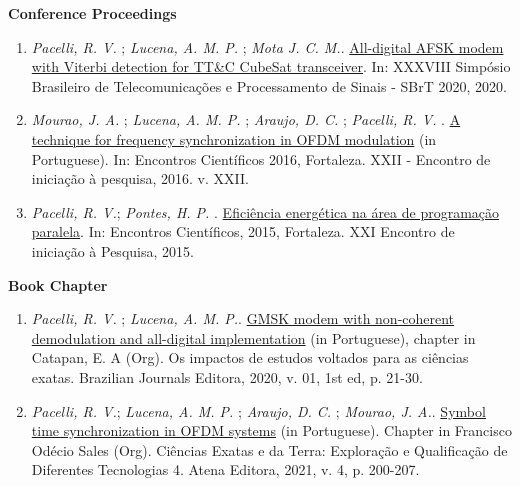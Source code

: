 \textbf{Conference Proceedings}
\begin{enumerate}[label=\textbf{C\arabic*.}, align=left, leftmargin=1.5cm]
    \item \textit{Pacelli, R. V.} ; \textit{Lucena, A. M. P.} ; \textit{Mota J. C. M.}. \href{http://www.sbrt.org.br/sbrt2020/papers/1570654898.pdf}{All-digital AFSK modem with Viterbi detection for TT\&C CubeSat transceiver}. In: XXXVIII Simpósio Brasileiro de Telecomunicações e Processamento de Sinais - SBrT 2020, 2020.
    \item \textit{Mourao, J. A.} ; \textit{Lucena, A. M. P.} ; \textit{Araujo, D. C.} ; \textit{Pacelli, R. V.} . \href{https://uol.unifor.br/oul/conteudosite/?cdConteudo=6946081}{A technique for frequency synchronization in OFDM modulation} (in Portuguese). In: Encontros Científicos 2016, Fortaleza. XXII - Encontro de iniciação à pesquisa, 2016. v. XXII.
    \item \textit{Pacelli, R. V.}; \textit{Pontes, H. P.} . \href{https://uol.unifor.br/oul/conteudosite/?cdConteudo=6111841}{Eficiência energética na área de programação paralela}. In: Encontros Científicos, 2015, Fortaleza. XXI Encontro de iniciação à Pesquisa, 2015.
\end{enumerate}

\newpage

\textbf{Book Chapter}
\begin{enumerate}[label=\textbf{BC\arabic*.}, align=left, leftmargin=1.5cm]
    \item \textit{Pacelli, R. V.} ; \textit{Lucena, A. M. P.}. \href{https://www.brazilianjournals.com.br/assets/ebooks/2c9747ceb79e967166c7d80a9ff8e1da.pdf}{GMSK modem with non-coherent demodulation and all-digital implementation} (in Portuguese), chapter in Catapan, E. A (Org). Os impactos de estudos voltados para as ciências exatas. Brazilian Journals Editora, 2020, v. 01, 1st ed, p. 21-30.
    \item \textit{Pacelli, R. V.}; \textit{Lucena, A. M. P.} ; \textit{Araujo, D. C.} ; \textit{Mourao, J. A.}. \href{https://www.finersistemas.com/atenaeditora/index.php/admin/api/ebookPDF/3771}{Symbol time synchronization in OFDM systems} (in Portuguese). Chapter in Francisco Odécio Sales (Org). Ciências Exatas e da Terra: Exploração e Qualificação de Diferentes Tecnologias 4. Atena Editora, 2021, v. 4, p. 200-207.
\end{enumerate}